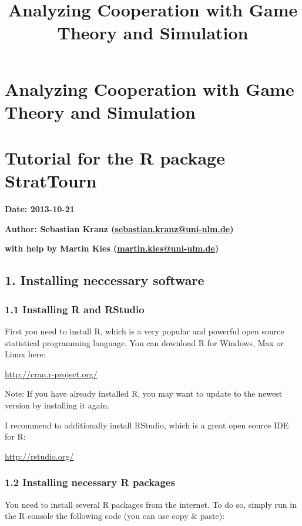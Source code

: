 \documentclass[]{article}
\title{Analyzing Cooperation with Game Theory and Simulation}
\author{}
\date{}
\begin{document}
\maketitle

\section{Analyzing Cooperation with Game Theory and Simulation}

\section{Tutorial for the R package StratTourn}

\textbf{Date: 2013-10-21}

\textbf{Author: Sebastian Kranz
(\href{mailto:sebastian.kranz@uni-ulm.de}{sebastian.kranz@uni-ulm.de})}

\textbf{with help by Martin Kies
(\href{mailto:martin.kies@uni-ulm.de}{martin.kies@uni-ulm.de})}

\subsection{1. Installing neccessary software}

\subsubsection{1.1 Installing R and RStudio}

First you need to install R, which is a very popular and powerful open
source statistical programming language. You can download R for Windows,
Max or Linux here:

\href{http://cran.r-project.org/}{http://cran.r-project.org/}

Note: If you have already installed R, you may want to update to the
newest version by installing it again.

I recommend to additionally install RStudio, which is a great open
source IDE for R:

\href{http://rstudio.org/}{http://rstudio.org/}

\subsubsection{1.2 Installing necessary R packages}

You need to install several R packages from the internet. To do so,
simply run in the R console the following code (you can use copy \&
paste):
\end{document}
